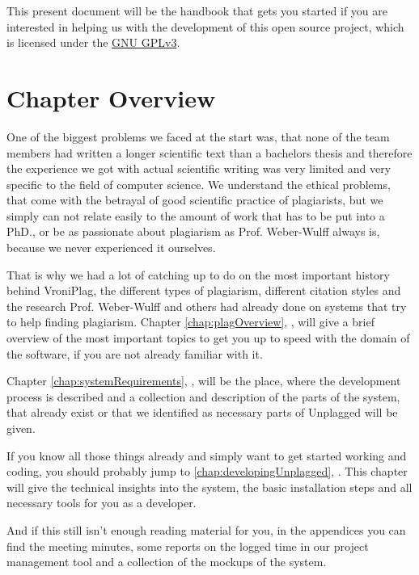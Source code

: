 This present document will be the handbook that gets you started if you are interested in helping us with the development of this 
open source project, which is licensed under the \href{http://www.gnu.org/licenses/quick-guide-gplv3}{GNU GPLv3}.

\section*{Chapter Overview}

One of the biggest problems we faced at the start was, that none of the team members had written a longer scientific
text than a bachelors
thesis and therefore the experience we got with actual scientific writing was very limited and very specific to the 
field of computer science. We understand the ethical problems, that come with the betrayal of 
good scientific practice of plagiarists, but we simply can not relate easily to the amount of work that has to be put into 
a PhD., or be as 
passionate about plagiarism as Prof. Weber-Wulff always is, because we never experienced it ourselves.

That is why we had a lot of catching up to do on the most important history behind VroniPlag, the different types
of plagiarism, different citation styles and the research Prof. Weber-Wulff and others had already done on systems that try to 
help finding plagiarism. Chapter \ref{chap:plagOverview}, , will
give a brief overview of the most important topics to get you up to speed with the domain of the software, if you are
not already familiar with it.

Chapter \ref{chap:systemRequirements}, , will be the place, where the development process is described and a collection and description 
of the parts of the system, that already exist or that we identified as 
necessary parts of Unplagged will be given.

If you know all those things already and simply want to get started working and coding, you should probably jump
to \ref{chap:developingUnplagged}, . This chapter will give the technical insights into 
the system, the basic installation
steps and all necessary tools for you as a developer.

And if this still isn't enough reading material for you, in the appendices you can find the meeting minutes, some reports
on the logged time in our project management tool and a collection of the mockups of the system.

